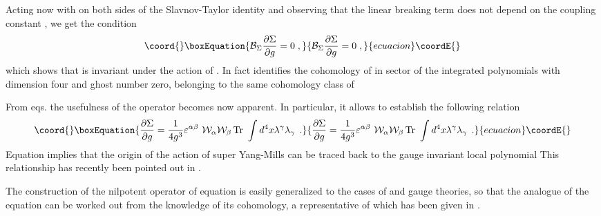 \documentclass[a4paper,12pt]{article}
\begin{document}
Acting now with \coordHE{} on both sides of the Slavnov-Taylor
identity \myHighlight{$\left( \ref{n1slav}\right) $}\coordHE{} and observing that the linear
breaking term \coordHE{} does not depend on the coupling
constant \coordHE{}, we get the condition 
\begin{equation}\coord{}\boxEquation{
\mathcal{B}_{\Sigma }\frac{\partial \Sigma }{\partial g}=0\;,  \label{n2cond}
}{
\mathcal{B}_{\Sigma }\frac{\partial \Sigma }{\partial g}=0\;,  }{ecuacion}\coordE{}\end{equation}
which shows that \coordHE{} is invariant under the action
of \coordHE{}. In fact \coordHE{} identifies
the cohomology of \coordHE{} in sector of the integrated
polynomials with dimension four and ghost number zero, belonging to the same
cohomology class of \coordHE{}

From eqs.\myHighlight{$\left( \ref{soln1}\right) ,$}\coordHE{} the usefulness of the operator \coordHE{} becomes now apparent. In particular, it allows to
establish the following relation 
\begin{equation}\coord{}\boxEquation{
\frac{\partial \Sigma }{\partial g}=\frac{1}{4g^{3}}\varepsilon ^{\alpha
\beta }\,\,\mathcal{W}_{\alpha }\mathcal{W}_{\beta }\,\mathrm{Tr\,\,}\int
d^{4}x\lambda ^{\gamma }\lambda _{\gamma }\;\,.  \label{acn1final}
}{
\frac{\partial \Sigma }{\partial g}=\frac{1}{4g^{3}}\varepsilon ^{\alpha
\beta }\,\,\mathcal{W}_{\alpha }\mathcal{W}_{\beta }\,\mathrm{Tr\,\,}\int
d^{4}x\lambda ^{\gamma }\lambda _{\gamma }\;\,.  }{ecuacion}\coordE{}\end{equation}
Equation \myHighlight{$\left( \ref{acn1final}\right) $}\coordHE{} implies that the origin of the
action of \coordHE{} super Yang-Mills can be traced back to the gauge invariant
local polynomial \coordHE{}This relationship has recently been pointed out in \cite{ul}.

The construction of the nilpotent operator \coordHE{} of
equation \myHighlight{$\left( \ref{newb}\right) $}\coordHE{} is easily generalized to the cases of \coordHE{} and \coordHE{} gauge theories, so that the analogue of the equation \myHighlight{$\left( 
\ref{acn1final}\right) $}\coordHE{} can be worked out from the knowledge of its
cohomology, a representative of which has been given in \cite{n2,n41}.
\end{document}
